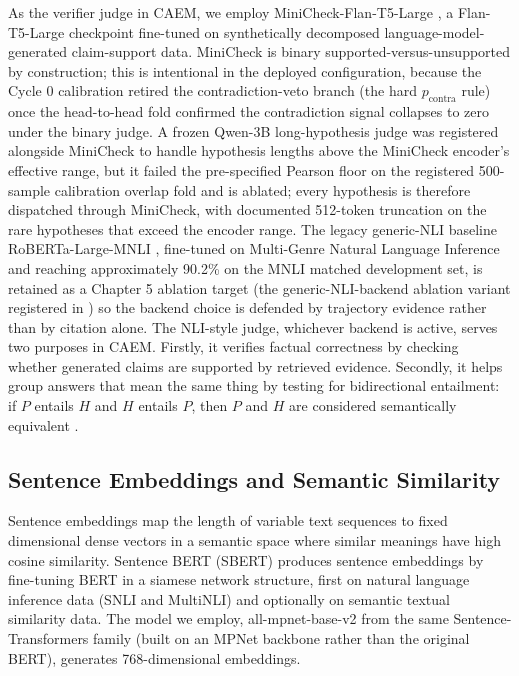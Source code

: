 As the verifier judge in CAEM, we employ MiniCheck-Flan-T5-Large \cite{tang2024minicheck}, a Flan-T5-Large checkpoint fine-tuned on synthetically decomposed language-model-generated claim-support data. MiniCheck is binary supported-versus-unsupported by construction; this is intentional in the deployed configuration, because the Cycle 0 calibration retired the contradiction-veto branch (the hard $p_{\text{contra}}$ rule) once the head-to-head fold confirmed the contradiction signal collapses to zero under the binary judge. A frozen Qwen-3B long-hypothesis judge was registered alongside MiniCheck to handle hypothesis lengths above the MiniCheck encoder's effective range, but it failed the pre-specified Pearson floor on the registered 500-sample calibration overlap fold and is ablated; every hypothesis is therefore dispatched through MiniCheck, with documented 512-token truncation on the rare hypotheses that exceed the encoder range. The legacy generic-NLI baseline RoBERTa-Large-MNLI \cite{liu2019roberta}, fine-tuned on Multi-Genre Natural Language Inference and reaching approximately 90.2\% on the MNLI matched development set, is retained as a Chapter 5 ablation target (the generic-NLI-backend ablation variant registered in ) so the backend choice is defended by trajectory evidence rather than by citation alone. The NLI-style judge, whichever backend is active, serves two purposes in CAEM. Firstly, it verifies factual correctness by checking whether generated claims are supported by retrieved evidence. Secondly, it helps group answers that mean the same thing by testing for bidirectional entailment: if $P$ entails $H$ and $H$ entails $P$, then $P$ and $H$ are considered semantically equivalent \cite{kuhn2023semantic}.

\subsection{Sentence Embeddings and Semantic Similarity}

Sentence embeddings map the length of variable text sequences to fixed dimensional dense vectors in a semantic space where similar meanings have high cosine similarity. Sentence BERT (SBERT) \cite{reimers-gurevych-2019-sentence} produces sentence embeddings by fine-tuning BERT in a siamese network structure, first on natural language inference data (SNLI and MultiNLI) and optionally on semantic textual similarity data. The model we employ, all-mpnet-base-v2 from the same Sentence-Transformers family (built on an MPNet backbone rather than the original BERT), generates 768-dimensional embeddings.

